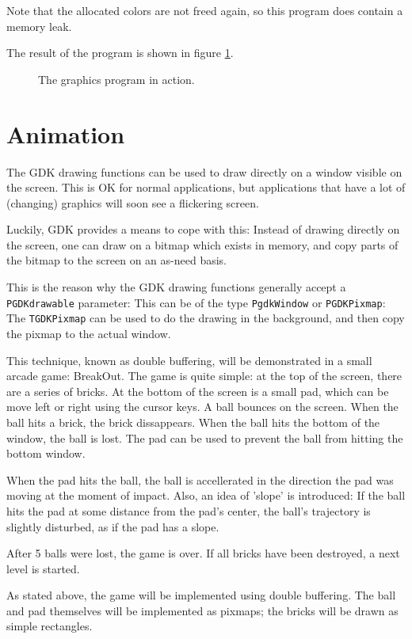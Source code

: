 \documentclass[10pt]{article}
\newcommand{\var}[1]{\texttt{#1}}
\begin{document}
Note that the allocated colors are not freed again, so this program does
contain a memory leak.

The result of the program is shown in figure \ref{fig:screenshot1}.
\begin{figure}[ht]
\caption{The graphics program in action.}\label{fig:screenshot1}
\end{figure}

\section{Animation}
The GDK drawing functions can be used to draw directly on a window visible
on the screen. This is OK for normal applications, but applications that
have a lot of (changing) graphics will soon see a flickering screen. 

Luckily, GDK provides a means to cope with this: Instead of drawing directly
on the screen, one can draw on a bitmap which exists in memory, and copy
parts of the bitmap to the screen on an as-need basis.

This is the reason why the GDK drawing functions generally accept a
\var{PGDKdrawable} parameter: This can be of the type \var{PgdkWindow} or
\var{PGDKPixmap}: The \var{TGDKPixmap} can be used to do the drawing in the
background, and then copy the pixmap to the actual window. 

This technique, known as double buffering, will be demonstrated in a small
arcade game: BreakOut. The game is quite simple: at the top of the screen,
there are a series of bricks. At the bottom of the screen is a small pad,
which can be move left or right using the cursor keys. A ball bounces on the
screen. When the ball hits a brick, the brick dissappears. When the ball
hits the bottom of the window, the ball is lost. The pad can be used to
prevent the ball from hitting the bottom window.

When the pad hits the ball, the ball is accellerated in the direction the
pad was moving at the moment of impact. Also, an idea of 'slope' is
introduced: If the ball hits the pad at some distance from the pad's center,
the ball's trajectory is slightly disturbed, as if the pad has a slope.

After 5 balls were lost, the game is over. If all bricks have been
destroyed, a next level is started.

As stated above, the game will be implemented using double buffering.
The ball and pad themselves will be implemented as pixmaps; the bricks
will be drawn as simple rectangles.
\end{document}
